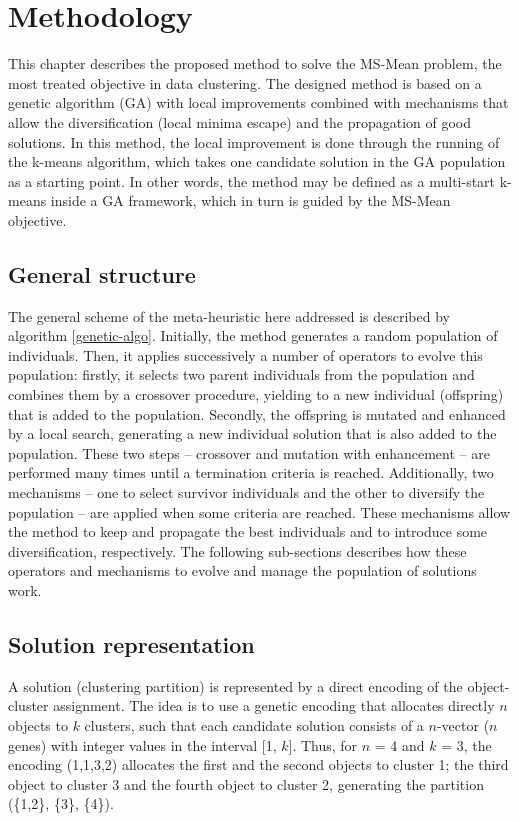 \chapter{Methodology}
\label{chap:methodology}
This chapter describes the proposed method to solve the MS-Mean problem, the most treated objective in data clustering. The designed method is based on a genetic algorithm (GA) with local improvements combined with mechanisms that allow the diversification (local minima escape) and the propagation of good solutions. In this method, the local improvement is done through the running of the k-means algorithm, which takes one candidate solution in the GA population as a starting point. In other words, the method may be defined as a multi-start k-means inside a GA framework, which in turn is guided by the MS-Mean objective.

\section{General structure}
The general scheme of the meta-heuristic here addressed is described by algorithm \ref{genetic-algo}. Initially, the method generates a random population of individuals. Then, it applies successively a number of operators to evolve this population: firstly, it selects two parent individuals from the population and combines them by a crossover procedure, yielding to a new individual (offspring) that is added to the population. Secondly, the offspring is mutated and enhanced by a local search, generating a new individual solution that is also added to the population. These two steps -- crossover and mutation with enhancement -- are performed many times until a termination criteria is reached. Additionally, two mechanisms -- one to select survivor individuals and the other to diversify the population -- are applied when some criteria are reached. These mechanisms allow the method to keep and propagate the best individuals and to introduce some diversification, respectively. The following sub-sections describes how these operators and mechanisms to evolve and manage the population of solutions work.

\section{Solution representation}
A solution (clustering partition) is represented by a direct encoding of the object-cluster assignment. The idea is to use a genetic encoding that allocates directly $n$ objects to $k$ clusters, such that each candidate solution consists of a $n$-vector ($n$ genes) with integer values in the interval [1, $k$]. Thus, for $n$ = 4 and $k$ = 3, the encoding (1,1,3,2) allocates the first and the second objects to cluster 1; the third object to cluster 3 and the fourth object to cluster 2, generating the partition (\{1,2\}, \{3\}, \{4\}).

